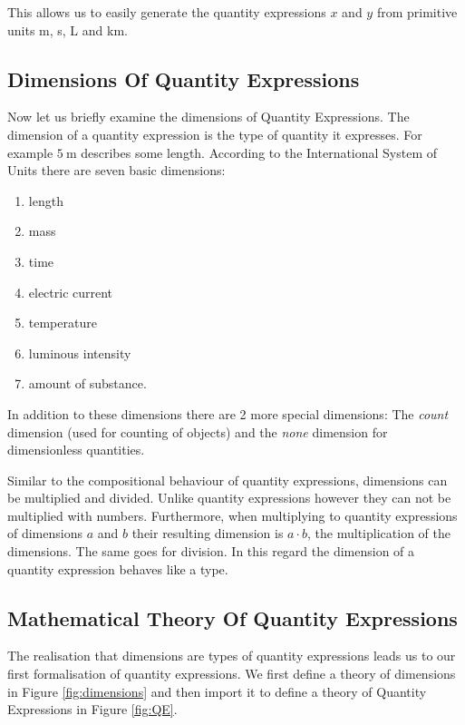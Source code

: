 This allows us to easily generate the quantity expressions $x$ and $y$ from primitive units m, s, L and km.

\subsection{Dimensions Of Quantity Expressions}
Now let us briefly examine the dimensions of Quantity Expressions. The dimension of a quantity expression is the type of quantity it expresses. For example $5\ \text{m}$ describes some length. According to the International System of Units there are seven basic dimensions:
\begin{enumerate}
  \item length
  \item mass
  \item time
  \item electric current
  \item temperature
  \item luminous intensity
  \item amount of substance.
\end{enumerate}

In addition to these dimensions there are 2 more special dimensions: The \textit{count} dimension (used for counting of objects) and the \textit{none} dimension for dimensionless quantities. 

Similar to the compositional behaviour of quantity expressions, dimensions can be multiplied and divided. Unlike quantity expressions however they can not be multiplied with numbers. Furthermore, when multiplying to quantity expressions of dimensions $a$ and $b$ their resulting dimension is $a \cdot{} b$, the multiplication of the dimensions. The same goes for division. In this regard the dimension of a quantity expression behaves like a type.

\subsection{Mathematical Theory Of Quantity Expressions}
\label{sec:qeform}

The realisation that dimensions are types of quantity expressions leads us to our first formalisation of quantity expressions. We first define a theory of dimensions in Figure \ref{fig:dimensions} and then import it to define a theory of Quantity Expressions in Figure \ref{fig:QE}.



